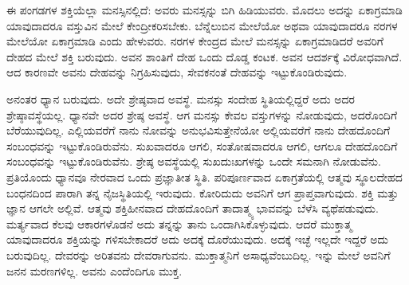 ಈ ಪಂಗಡಗಳ ಶಕ್ತಿಯೆಲ್ಲಾ ಮನಸ್ಸಿನಲ್ಲಿದೆ: ಅವರು ಮನಸ್ಸನ್ನು ಬಿಗಿ ಹಿಡಿಯುವರು. ಮೊದಲು ಅದನ್ನು ಏಕಾಗ್ರಮಾಡಿ ಯಾವುದಾದರೂ ವಸ್ತುವಿನ ಮೇಲೆ ಕೇಂದ್ರೀಕರಿಸಬೇಕು. ಬೆನ್ನೆಲುಬಿನ ಮೇಲೆಯೋ ಅಥವಾ ಯಾವುದಾದರೂ ನರಗಳ ಮೇಲೆಯೋ ಏಕಾಗ್ರಮಾಡಿ ಎಂದು ಹೇಳುವರು. ನರಗಳ ಕೇಂದ್ರದ ಮೇಲೆ ಮನಸ್ಸನ್ನು ಏಕಾಗ್ರಮಾಡಿದರೆ ಅವರಿಗೆ ದೇಹದ ಮೇಲೆ ಶಕ್ತಿ ಬರುವುದು. ಅವನ ಶಾಂತಿಗೆ ದೇಹ ಒಂದು ದೊಡ್ಡ ಕಂಟಕ. ಅವನ ಆದರ್ಶಕ್ಕೆ ವಿರೋಧವಾಗಿದೆ. ಆದ ಕಾರಣವೇ ಅವನು ದೇಹವನ್ನು ನಿಗ್ರಹಿಸುವುದು, ಸೇವಕನಂತೆ ದೇಹವನ್ನು ಇಟ್ಟುಕೊಂಡಿರುವುದು.

ಅನಂತರ ಧ್ಯಾನ ಬರುವುದು. ಅದೇ ಶ್ರೇಷ್ಠವಾದ ಅವಸ್ಥೆ. ಮನಸ್ಸು ಸಂದೇಹ ಸ್ಥಿತಿಯಲ್ಲಿದ್ದರೆ ಅದು ಅದರ ಶ್ರೇಷ್ಠಾವಸ್ಥೆಯಲ್ಲ. ಧ್ಯಾನವೇ ಅದರ ಶ್ರೇಷ್ಠ ಅವಸ್ಥೆ. ಆಗ ಮನಸ್ಸು ಕೇವಲ ವಸ್ತುಗಳನ್ನು ನೋಡುವುದು, ಅದರೊಂದಿಗೆ ಬೆರೆಯುವುದಿಲ್ಲ. ಎಲ್ಲಿಯವರೆಗೆ ನಾನು ನೋವನ್ನು ಅನುಭವಿಸುತ್ತೇನೆಯೋ ಅಲ್ಲಿಯವರೆಗೆ ನಾನು ದೇಹದೊಂದಿಗೆ ಸಂಬಂಧವನ್ನು ಇಟ್ಟುಕೊಂಡಿರುವೆನು. ಸುಖವಾದರೂ ಆಗಲಿ, ಸಂತೋಷವಾದರೂ ಆಗಲಿ, ಆಗಲೂ ದೇಹದೊಂದಿಗೆ ಸಂಬಂಧವನ್ನು ಇಟ್ಟುಕೊಂಡಿರುವೆನು. ಶ್ರೇಷ್ಠ ಅವಸ್ಥೆಯಲ್ಲಿ ಸುಖದುಃಖಗಳನ್ನು ಒಂದೇ ಸಮನಾಗಿ ನೋಡುವೆನು. ಪ್ರತಿಯೊಂದು ಧ್ಯಾನವೂ ನೇರವಾದ ಒಂದು ಪ್ರಜ್ಞಾತೀತ ಸ್ಥಿತಿ. ಪರಿಪೂರ್ಣವಾದ ಏಕಾಗ್ರತೆಯಲ್ಲಿ ಆತ್ಮವು ಸ್ಥೂಲದೇಹದ ಬಂಧನದಿಂದ ಪಾರಾಗಿ ತನ್ನ ನೈಜಸ್ಥಿತಿಯಲ್ಲಿ ಇರುವುದು. ಕೋರಿದುದು ಅವನಿಗೆ ಆಗ ಪ್ರಾಪ್ತವಾಗುವುದು. ಶಕ್ತಿ ಮತ್ತು ಜ್ಞಾನ ಆಗಲೇ ಅಲ್ಲಿವೆ. ಆತ್ಮವು ಶಕ್ತಿಹೀನವಾದ ದೇಹದೊಂದಿಗೆ ತಾದಾತ್ಮ್ಯ ಭಾವವನ್ನು ಬೆಳೆಸಿ ವ್ಯಥೆಪಡುವುದು. ಮರ್ತ್ಯವಾದ ಕೆಲವು ಆಕಾರಗಳೊಡನೆ ಅದು ತನ್ನನ್ನು ತಾನು ಒಂದಾಗಿಸಿಕೊಳ್ಳುವುದು. ಆದರೆ ಮುಕ್ತಾತ್ಮ ಯಾವುದಾದರೂ ಶಕ್ತಿಯನ್ನು ಗಳಿಸಬೇಕಾದರೆ ಅದು ಅದಕ್ಕೆ ದೊರೆಯುವುದು. ಅದಕ್ಕೆ ಇಚ್ಛೆ ಇಲ್ಲದೇ ಇದ್ದರೆ ಅದು ಬರುವುದಿಲ್ಲ. ದೇವರನ್ನು ಅರಿತವನು ದೇವರಾಗುವನು. ಮುಕ್ತಾತ್ಮನಿಗೆ ಅಸಾಧ್ಯವೆಂಬುದಿಲ್ಲ. ಇನ್ನು ಮೇಲೆ ಅವನಿಗೆ ಜನನ ಮರಣಗಳಿಲ್ಲ. ಅವನು ಎಂದೆಂದಿಗೂ ಮುಕ್ತ.

